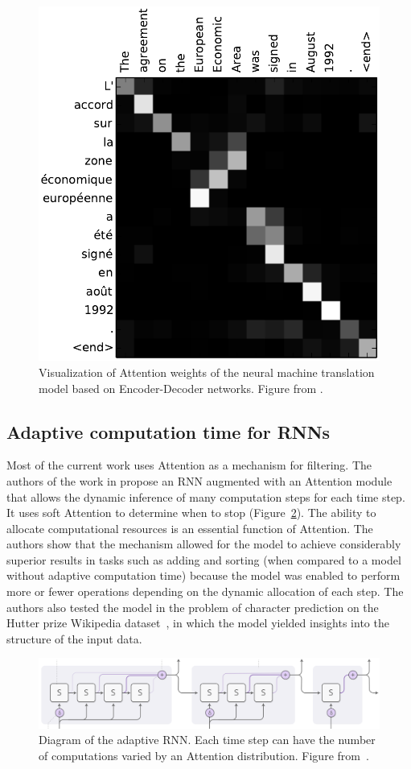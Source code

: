 \documentclass[12pt]{article}
\begin{document}
\begin{figure}
\begin{center}
    \includegraphics[width=0.31\linewidth]{./img/nt-att.png}
\caption{
    Visualization of Attention weights of the neural machine translation model
    based on Encoder-Decoder networks.
    Figure from \cite{ref:enc-dec}.
}
\label{fig:ntatt}
\end{center}
\end{figure}

\subsection{Adaptive computation time for RNNs}
Most of the current work uses Attention as a mechanism for filtering.
The authors of the work in \cite{ref:act} propose an RNN augmented with an Attention module that allows the dynamic inference of many computation steps for each time step.
It uses soft Attention to determine when to stop (Figure~\ref{fig:adaptive-comp}).
The ability to allocate computational resources is an essential function of Attention.
The authors show that the mechanism allowed for the model to achieve considerably superior results
in tasks such as adding and sorting (when compared to a model without adaptive computation time)
because the model was enabled to perform more or fewer operations depending on the dynamic allocation 
of each step.
The authors also tested the model in the problem of character prediction on the Hutter prize Wikipedia
dataset~\cite{ref:hutter}, in which the model yielded insights into the structure of the input data.

\begin{figure}[!htb]
\begin{center}
    \includegraphics[width=0.9\linewidth]{./img/adaptive_comp.png}
\caption{
    Diagram of the adaptive RNN.
    Each time step can have the number of computations varied by an Attention distribution.
    Figure from~\cite{ref:distill}.
}
\label{fig:adaptive-comp}
\end{center}
\end{figure}
\end{document}
